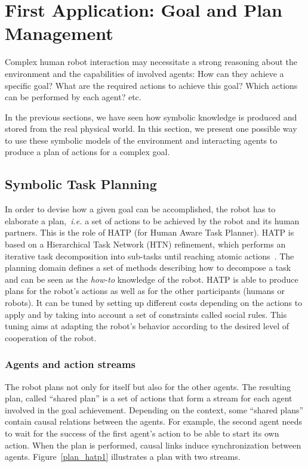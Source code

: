 \documentclass{svmult}
\begin{document}

\section{First Application: Goal and Plan Management}
\label{sec|hatp}

Complex human robot interaction may necessitate a strong reasoning about
the environment and the capabilities of involved agents: How can they
achieve a specific goal? What are the required actions to achieve this
goal? Which actions can be performed by each agent? etc.

In the previous sections, we have seen how symbolic knowledge is produced
and stored from the real physical world. In this section, we present one
possible way to use these symbolic models of the environment and
interacting agents to produce a plan of actions for a complex
goal.

\subsection{Symbolic Task Planning}

In order to devise how a given goal can be accomplished, the robot has
to elaborate a plan,~\textit{i.e.} a set of actions to be achieved by
the robot and its human partners.  This is the role of HATP
\cite{Alili2008} (for Human Aware Task Planner).  HATP is based on a
Hierarchical Task Network (HTN) refinement, which performs an iterative
task decomposition into sub-tasks until reaching atomic
actions~\cite{Nau2003}.  The planning domain defines a set of methods
describing how to decompose a task and can be seen as the {\it how-to}
knowledge of the robot.  HATP is able to produce plans for the robot's
actions as well as for the other participants (humans or robots). It
can be tuned by setting up different costs depending on the actions to
apply and by taking into account a set of constraints called social
rules. This tuning aims at adapting the robot's behavior according to
the desired level of cooperation of the robot.

\subsubsection{Agents and action streams}

The robot plans not only for itself but also for the other agents. The
resulting plan, called ``shared plan'' is a set of actions that form
a stream for each agent involved in the goal achievement. Depending on
the context, some ``shared plans'' contain causal relations between the
agents. For example, the second agent needs to wait for the success of
the first agent's action to be able to start its own action. When the
plan is performed, causal links induce synchronization between
agents. Figure~\ref{plan_hatp1} illustrates a plan with two streams.
\end{document}
